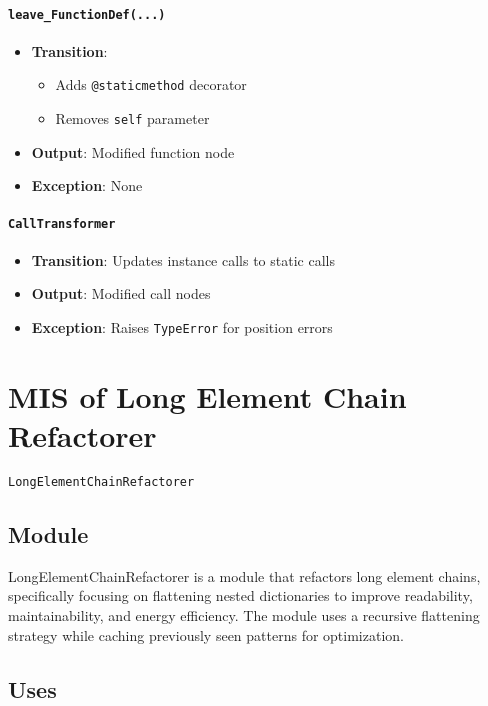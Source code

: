 \documentclass[12pt, titlepage]{article}
\begin{document}
\paragraph{\texttt{leave\_FunctionDef(...)}}
\begin{itemize}
\item \textbf{Transition}:
\begin{itemize}
\item Adds \texttt{@staticmethod} decorator
\item Removes \texttt{self} parameter
\end{itemize}
\item \textbf{Output}: Modified function node
\item \textbf{Exception}: None
\end{itemize}

\paragraph{\texttt{CallTransformer}}
\begin{itemize}
\item \textbf{Transition}: Updates instance calls to static calls
\item \textbf{Output}: Modified call nodes
\item \textbf{Exception}: Raises \texttt{TypeError} for position errors
\end{itemize}

\newpage  


\section{MIS of Long Element Chain Refactorer} \label{mis:lec}

\texttt{LongElementChainRefactorer}

\subsection{Module}

LongElementChainRefactorer is a module that refactors long element chains, specifically focusing on flattening nested dictionaries to improve readability, maintainability, and energy efficiency. The module uses a recursive flattening strategy while caching previously seen patterns for optimization.

\subsection{Uses}
\end{document}
